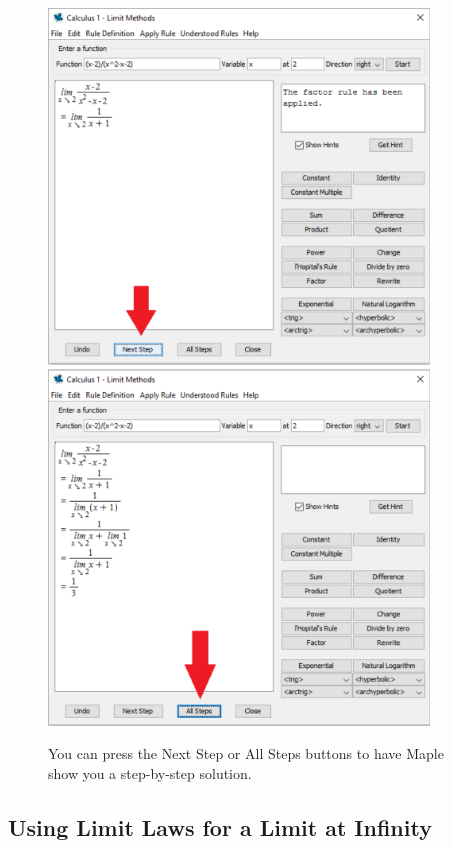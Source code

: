 \begin{figure}[h]
\caption{You can press the Next Step or All Steps buttons to have Maple show you a step-by-step solution.}
\centering
\includegraphics[width=0.9\textwidth]{tutorials/figures/LimitTutorQ1-2-eps-converted-to.pdf}
\includegraphics[width=0.9\textwidth]{tutorials/figures/LimitTutorQ1-3-eps-converted-to.pdf}
\end{figure}
\newpage

\clearpage

\subsection{Using Limit Laws for a Limit at Infinity}

